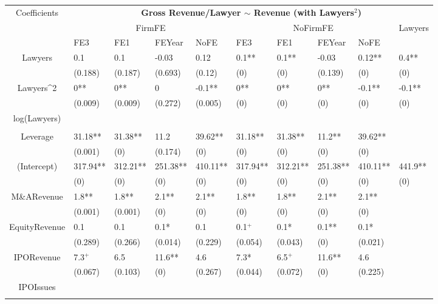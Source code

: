 \documentclass{article}
\begin{document}
\begin{table}[H]
\centering
\begin{tabular}{|clllllllll|}
\hline
\multirow{3}{*}{Coefficients} & \multicolumn{9}{c|}{\textbf{Gross Revenue/Lawyer $\sim$ Revenue (with Lawyers$^2$)}} \\
\cline{2-10}
& \multicolumn{4}{c}{FirmFE} & \multicolumn{4}{c}{NoFirmFE} & \multirow{2}{*}{Lawyers} \\
\cline{2-9}
& FE3 & FE1 & FEYear & NoFE & FE3 & FE1 & FEYear & NoFE &  \\
\hline
 
Lawyers & 0.1 & 0.1 & -0.03 & 0.12 & 0.1** & 0.1** & -0.03 & 0.12** & 0.4** \\ 
   & (0.188) & (0.187) & (0.693) & (0.12) & (0) & (0) & (0.139) & (0) & (0) \\ 
  Lawyers^2 & 0** & 0** & 0 & -0.1** & 0** & 0** & 0** & -0.1** & -0.1** \\ 
   & (0.009) & (0.009) & (0.272) & (0.005) & (0) & (0) & (0) & (0) & (0) \\ 
  log(Lawyers) &  &  &  &  &  &  &  &  &  \\ 
   &  &  &  &  &  &  &  &  &  \\ 
  Leverage & 31.18** & 31.38** & 11.2 & 39.62** & 31.18** & 31.38** & 11.2** & 39.62** &  \\ 
   & (0.001) & (0) & (0.174) & (0) & (0) & (0) & (0) & (0) &  \\ 
  (Intercept) & 317.94** & 312.21** & 251.38** & 410.11** & 317.94** & 312.21** & 251.38** & 410.11** & 441.9** \\ 
   & (0) & (0) & (0) & (0) & (0) & (0) & (0) & (0) & (0) \\ 
  M\&ARevenue & 1.8** & 1.8** & 2.1** & 2.1** & 1.8** & 1.8** & 2.1** & 2.1** &  \\ 
   & (0.001) & (0.001) & (0) & (0) & (0) & (0) & (0) & (0) &  \\ 
  EquityRevenue & 0.1 & 0.1 & 0.1* & 0.1 & 0.1$^{+}$ & 0.1* & 0.1** & 0.1* &  \\ 
   & (0.289) & (0.266) & (0.014) & (0.229) & (0.054) & (0.043) & (0) & (0.021) &  \\ 
  IPORevenue & 7.3$^{+}$ & 6.5 & 11.6** & 4.6 & 7.3* & 6.5$^{+}$ & 11.6** & 4.6 &  \\ 
   & (0.067) & (0.103) & (0) & (0.267) & (0.044) & (0.072) & (0) & (0.225) &  \\ 
  IPOIssues &  &  &  &  &  &  &  &  &  \\ 
   &  &  &  &  &  &  &  &  &  \\ 

\end{tabular}
\end{table}
\end{document}
